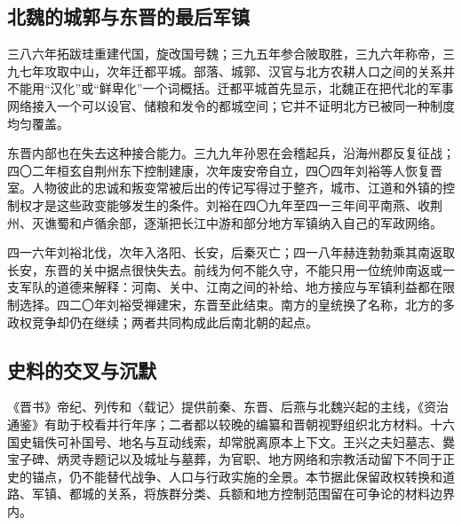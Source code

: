 \subsection{北魏的城郭与东晋的最后军镇}

三八六年拓跋珪重建代国，旋改国号魏；三九五年参合陂取胜，三九六年称帝，三九七年攻取中山，次年迁都平城。部落、城郭、汉官与北方农耕人口之间的关系并不能用“汉化”或“鲜卑化”一个词概括。迁都平城首先显示，北魏正在把代北的军事网络接入一个可以设官、储粮和发令的都城空间；它并不证明北方已被同一种制度均匀覆盖。

东晋内部也在失去这种接合能力。三九九年孙恩在会稽起兵，沿海州郡反复征战；四〇二年桓玄自荆州东下控制建康，次年废安帝自立，四〇四年刘裕等人恢复晋室。人物彼此的忠诚和叛变常被后出的传记写得过于整齐，城市、江道和外镇的控制权才是这些政变能够发生的条件。刘裕在四〇九年至四一三年间平南燕、收荆州、灭谯蜀和卢循余部，逐渐把长江中游和部分地方军镇纳入自己的军政网络。

四一六年刘裕北伐，次年入洛阳、长安，后秦灭亡；四一八年赫连勃勃乘其南返取长安，东晋的关中据点很快失去。前线为何不能久守，不能只用一位统帅南返或一支军队的道德来解释：河南、关中、江南之间的补给、地方接应与军镇利益都在限制选择。四二〇年刘裕受禅建宋，东晋至此结束。南方的皇统换了名称，北方的多政权竞争却仍在继续；两者共同构成此后南北朝的起点。

\subsection{史料的交叉与沉默}

《晋书》帝纪、列传和〈载记〉提供前秦、东晋、后燕与北魏兴起的主线，《资治通鉴》有助于校看并行年序；二者都以较晚的编纂和晋朝视野组织北方材料。十六国史辑佚可补国号、地名与互动线索，却常脱离原本上下文。王兴之夫妇墓志、爨宝子碑、炳灵寺题记以及城址与墓葬，为官职、地方网络和宗教活动留下不同于正史的锚点，仍不能替代战争、人口与行政实施的全景。本节据此保留政权转换和道路、军镇、都城的关系，将族群分类、兵额和地方控制范围留在可争论的材料边界内。
